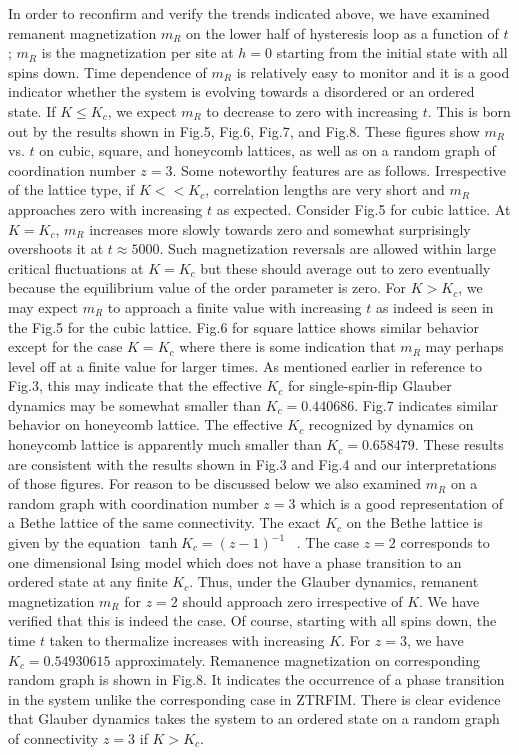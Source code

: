 \documentclass[a4,aps,amsmath,floatfix,nofootinbib,10pt]{revtex4}
\begin{document}
In order to reconfirm and verify the trends indicated above, we have 
examined remanent magnetization $m_R$ on the lower half of hysteresis 
loop as a function of $t$; $m_R$ is the magnetization per site at $h=0$ 
starting from the initial state with all spins down. Time dependence of 
$m_R$ is relatively easy to monitor and it is a good indicator whether 
the system is evolving towards a disordered or an ordered state. If $K 
\le K_c$, we expect $m_R$ to decrease to zero with increasing $t$. This 
is born out by the results shown in Fig.5, Fig.6, Fig.7, and Fig.8. 
These figures show $m_R$ vs. $t$ on cubic, square, and honeycomb 
lattices, as well as on a random graph of coordination number $z=3$. 
Some noteworthy features are as follows. Irrespective of the lattice 
type, if $K << K_c$, correlation lengths are very short and $m_R$ 
approaches zero with increasing $t$ as expected. Consider Fig.5 for 
cubic lattice. At $K=K_c$, $m_R$ increases more slowly towards zero and 
somewhat surprisingly overshoots it at $t \approx 5000$. Such 
magnetization reversals are allowed within large critical fluctuations 
at $K=K_c$ but these should average out to zero eventually because the 
equilibrium value of the order parameter is zero. For $K > K_c$, we may 
expect $m_R$ to approach a finite value with increasing $t$ as indeed 
is seen in the Fig.5 for the cubic lattice. Fig.6 for square lattice 
shows similar behavior except for the case $K=K_c$ where there is some 
indication that $m_R$ may perhaps level off at a finite value for 
larger times. As mentioned earlier in reference to Fig.3, this may 
indicate that the effective $K_c$ for single-spin-flip Glauber dynamics 
may be somewhat smaller than $K_c=0.440686$. Fig.7 indicates similar 
behavior on honeycomb lattice. The effective $K_c$ recognized by 
dynamics on honeycomb lattice is apparently much smaller than 
$K_c=0.658479$. These results are consistent with the results shown in 
Fig.3 and Fig.4 and our interpretations of those figures. For reason to 
be discussed below we also examined $m_R$ on a random graph with 
coordination number $z=3$ which is a good representation of a Bethe 
lattice of the same connectivity. The exact $K_c$ on the Bethe lattice 
is given by the equation $\tanh{K_c}=(z-1)^{-1}$ ~\cite{rozikov}. The 
case $z=2$ corresponds to one dimensional Ising model which does not 
have a phase transition to an ordered state at any finite $K_c$. Thus, 
under the Glauber dynamics, remanent magnetization $m_R$ for $z=2$ 
should approach zero irrespective of $K$. We have verified that this is 
indeed the case. Of course, starting with all spins down, the time $t$ 
taken to thermalize increases with increasing $K$. For $z=3$, we have 
$K_c=0.54930615$ approximately. Remanence magnetization on 
corresponding random graph is shown in Fig.8. It indicates the 
occurrence of a phase transition in the system unlike the corresponding 
case in ZTRFIM. There is clear evidence that Glauber dynamics takes the 
system to an ordered state on a random graph of connectivity $z=3$ if 
$K>K_c$.
\end{document}
